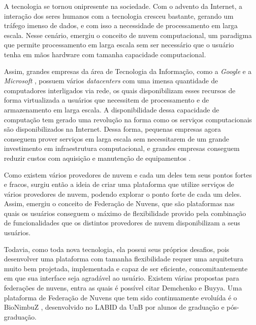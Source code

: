 A tecnologia se tornou onipresente na sociedade. Com o advento da Internet, a interação dos seres humanos com a tecnologia cresceu bastante, gerando um tráfego imenso de dados, e com isso a necessidade de processamento em larga escala. Nesse cenário, emergiu o conceito de nuvem computacional, um paradigma que permite processamento em larga escala sem ser necessário que o usuário tenha em mãos hardware com tamanha capacidade computacional.

Assim, grandes empresas da área de Tecnologia da Informação, como a \textit{Google} \cite{Google} e a \textit{Microsoft} \cite{Microsoft}, possuem vários \textit{datacenters} com uma imensa quantidade de computadores interligados via rede, os quais disponibilizam esses recursos de forma virtualizada a usuários que necessitem de processamento e de armazenamento em larga escala. A disponibilidade dessa capacidade de computação tem gerado uma revolução na forma como os serviços computacionais são disponibilizados na Internet.
Dessa forma, pequenas empresas agora conseguem prover serviços em larga escala sem necessitarem de um grande investimento em infraestrutura computacional, e grandes empresas conseguem reduzir custos com aquisição e manutenção de equipamentos \cite{WhatIsCloudComputing}.

Como existem vários provedores de nuvem e cada um deles tem seus pontos fortes e fracos, surgiu então a ideia de criar uma plataforma que utilize serviços de vários provedores de nuvem, podendo explorar o ponto forte de cada um deles. Assim, emergiu o conceito de Federação de Nuvens\cite{6427607}, que são plataformas nas quais os usuários conseguem o máximo de flexibilidade provido pela combinação de funcionalidades que os distintos provedores de nuvem disponibilizam a seus usuários.

Todavia, como toda nova tecnologia, ela possui seus próprios desafios, pois desenvolver uma plataforma com tamanha flexibilidade requer uma arquitetura muito bem projetada, implementada e capaz de ser eficiente, concomitantemente em que sua interface seja agradável ao usuário. Existem várias propostas para federações de nuvens, entra as quais é possível citar Demchenko\cite{6427607} e Buyya\cite{Buyya:2010:IUF:2143583.2143586}. Uma plataforma de Federação de Nuvens que tem sido continuamente evoluída é o BioNimbuZ \cite{BioNimbuZ_Breno_Deric} \cite{BioNimbuZ_Closer} \cite{BioNimbuZ_6846526} \cite{Saldanha2012} \cite{6732620_BioNimbuZ_ACOsched} \cite{BioNimbuZ_Willian_C99} \cite{closer12_BioNimbuZ_AHP} \cite{Saldanha_BioNimbus}, desenvolvido no \acrfull{LABID} da \acrfull{UnB} por alunos de graduação e pós-graduação.

